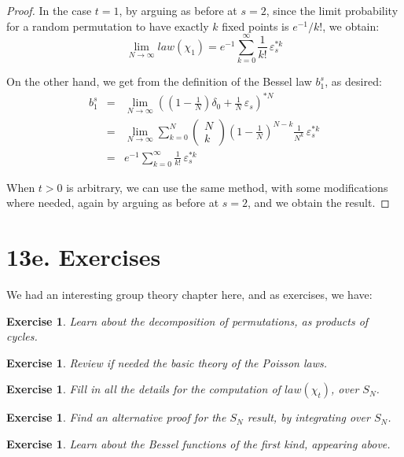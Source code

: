 \documentclass[12pt]{amsbook}
\newtheorem{exercise}[theorem]{Exercise}
\begin{document}
\begin{proof}
In the case $t=1$, by arguing as before at $s=2$, since the limit probability for a random permutation to have exactly $k$ fixed points is $e^{-1}/k!$, we obtain:
$$\lim_{N\to\infty}law(\chi_1)=e^{-1}\sum_{k=0}^\infty \frac{1}{k!}\,\varepsilon_s^{*k}$$

On the other hand, we get from the definition of the Bessel law $b^s_1$, as desired:
\begin{eqnarray*}
b^s_1
&=&\lim_{N\to\infty}\left(\left(1-\frac{1}{N}\right)\delta_0+\frac{1}{N}\,\varepsilon_s\right)^{*N}\\
&=&\lim_{N\to\infty}\sum_{k=0}^N\begin{pmatrix}N\\ k\end{pmatrix}\left(1-\frac{1}{N}\right)^{N-k}\frac{1}{N^k}\,\varepsilon_s^{*k}\\
&=&e^{-1}\sum_{k=0}^\infty\frac{1}{k!}\,\varepsilon_s^{*k}
\end{eqnarray*}

When $t>0$ is arbitrary, we can use the same method, with some modifications where needed, again by arguing as before at $s=2$, and we obtain the result.
\end{proof}

\section*{13e. Exercises}

We had an interesting group theory chapter here, and as exercises, we have:

\begin{exercise}
Learn about the decomposition of permutations, as products of cycles.
\end{exercise}

\begin{exercise}
Review if needed the basic theory of the Poisson laws.
\end{exercise}

\begin{exercise}
Fill in all the details for the computation of $law(\chi_t)$, over $S_N$.
\end{exercise}

\begin{exercise}
Find an alternative proof for the $S_N$ result, by integrating over $S_N$.
\end{exercise}

\begin{exercise}
Learn about the Bessel functions of the first kind, appearing above.
\end{exercise}
\end{document}
